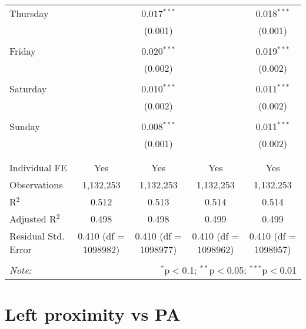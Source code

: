 \documentclass[
]{article}
\begin{document}
\begin{table}[!htbp]
{\begin{tabular}{@{\extracolsep{5pt}}lcccc}
 Thursday &  & 0.017$^{***}$ &  & 0.018$^{***}$ \\ 
  &  & (0.001) &  & (0.001) \\ 
  & & & & \\ 
 Friday &  & 0.020$^{***}$ &  & 0.019$^{***}$ \\ 
  &  & (0.002) &  & (0.002) \\ 
  & & & & \\ 
 Saturday &  & 0.010$^{***}$ &  & 0.011$^{***}$ \\ 
  &  & (0.002) &  & (0.002) \\ 
  & & & & \\ 
 Sunday &  & 0.008$^{***}$ &  & 0.011$^{***}$ \\ 
  &  & (0.001) &  & (0.002) \\ 
  & & & & \\ 
\hline \\[-1.8ex] 
Individual FE & Yes & Yes & Yes & Yes \\ 
Observations & 1,132,253 & 1,132,253 & 1,132,253 & 1,132,253 \\ 
R$^{2}$ & 0.512 & 0.513 & 0.514 & 0.514 \\ 
Adjusted R$^{2}$ & 0.498 & 0.498 & 0.499 & 0.499 \\ 
Residual Std. Error & 0.410 (df = 1098982) & 0.410 (df = 1098977) & 0.410 (df = 1098962) & 0.410 (df = 1098957) \\ 
\hline 
\hline \\[-1.8ex] 
\textit{Note:}  & \multicolumn{4}{r}{$^{*}$p$<$0.1; $^{**}$p$<$0.05; $^{***}$p$<$0.01} \\ 
\end{tabular}
} 
\end{table} 
\newpage
\section{Left proximity vs PA}
\end{document}

